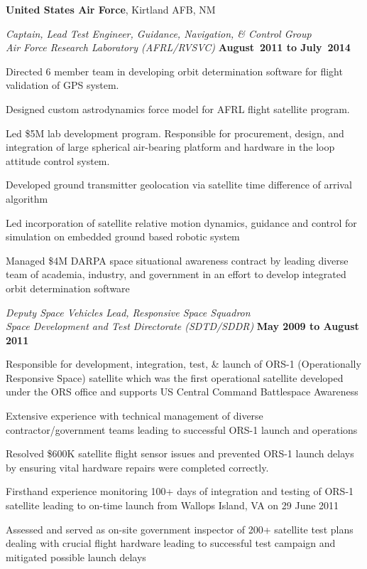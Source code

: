 \documentclass[10pt]{article}
\begin{document}
\textbf{United States Air Force}, Kirtland AFB, NM
\begin{lonelist}

\item[] \textit{Captain, Lead Test Engineer, Guidance, Navigation, \& Control Group \\}
\textit{Air Force Research Laboratory (AFRL/RVSVC)}%
    \hfill \textbf{August~2011 to July~2014}
    \begin{innerlist}
        \item Directed 6 member team in developing orbit determination software for flight validation of GPS system. 
		\item Designed custom astrodynamics force model for AFRL flight satellite program. 
        \item Led \$5M lab development program.  Responsible for procurement, design, and integration of large spherical air-bearing platform and hardware in the loop attitude control system. 
        \item Developed ground transmitter geolocation via satellite time difference of arrival algorithm
        \item Led incorporation of satellite relative motion dynamics, guidance and control for simulation on embedded ground based robotic system
        \item Managed \$4M DARPA space situational awareness contract by leading diverse team of academia, industry, and government in an effort to develop integrated orbit determination software
    \end{innerlist}

\item[] \textit{Deputy Space Vehicles Lead, Responsive Space Squadron\\}
	\textit{Space Development and Test Directorate (SDTD/SDDR)}%
    \hfill \textbf{May 2009 to August 2011}
    
    \begin{innerlist}
        \item Responsible for development, integration, test, \& launch of ORS-1 (Operationally Responsive Space) satellite which was the first operational satellite developed under the ORS office and supports US Central Command Battlespace Awareness
        \item Extensive experience with technical management of diverse contractor/government teams leading to successful ORS-1 launch and operations
        \item Resolved \$600K satellite flight sensor issues and prevented ORS-1 launch delays by ensuring vital hardware repairs were completed correctly.
	\item Firsthand experience monitoring 100+ days of integration and testing of ORS-1 satellite leading to on-time launch from Wallops Island, VA on 29 June 2011
	\item Assessed and served as on-site government inspector of 200+ satellite test plans dealing with crucial flight hardware leading to successful test campaign and mitigated possible launch delays
    \end{innerlist}

\end{lonelist} %
\end{document}
